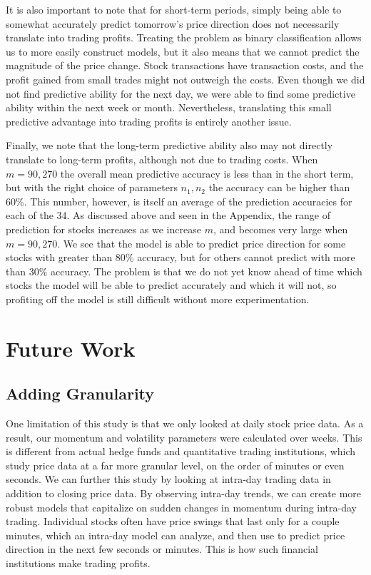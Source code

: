 \documentclass[pageno]{jpaper}
\begin{document}
It is also important to note that for short-term periods, simply being able to somewhat accurately predict tomorrow's price direction does not necessarily translate into trading profits. Treating the problem as binary classification allows us to more easily construct models, but it also means that we cannot predict the magnitude of the price change. Stock transactions have transaction costs, and the profit gained from small trades might not outweigh the costs.  Even though we did not find predictive ability for the next day, we were able to find some predictive ability within the next week or month. Nevertheless, translating this small predictive advantage into trading profits is entirely another issue.

Finally, we note that the long-term predictive ability also may not directly translate to long-term profits, although not due to trading costs. When $m=90, 270$ the overall mean predictive accuracy is less than in the short term, but with the right choice of parameters $n_1, n_2$ the accuracy can be higher than 60\%. This number, however, is itself an average of the prediction accuracies for each of the 34. As discussed above and seen in the Appendix, the range of prediction for stocks increases as we increase $m$, and becomes very large when $m=90, 270$. We see that the model is able to predict price direction for some stocks with greater than 80\% accuracy, but for others cannot predict with more than 30\% accuracy. The problem is that we do not yet know ahead of time which stocks the model will be able to predict accurately and which it will not, so profiting off the model is still difficult without more experimentation.

\section{Future Work}
\subsection{Adding Granularity}
One limitation of this study is that we only looked at daily stock price data. As a result, our momentum and volatility parameters were calculated over weeks. This is different from actual hedge funds and quantitative trading institutions, which study price data at a far more granular level, on the order of minutes or even seconds. We can further this study by looking at intra-day trading data in addition to closing price data. By observing intra-day trends, we can create more robust models that capitalize on sudden changes in momentum during intra-day trading. Individual stocks often have price swings that last only for a couple minutes, which an intra-day model can analyze, and then use to predict price direction in the next few seconds or minutes. This is how such financial institutions make trading profits.
\end{document}

